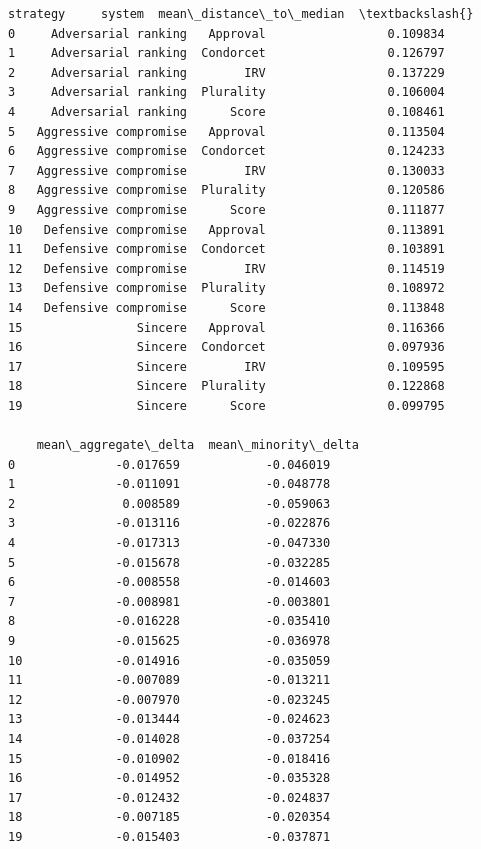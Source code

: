 \documentclass[11pt]{article}
\makeatletter
\newcommand{\boxspacing}{\kern\kvtcb@left@rule\kern\kvtcb@boxsep}
\newcommand{\prompt}[4]{
        {\ttfamily\llap{{\color{#2}[#3]:\hspace{3pt}#4}}\vspace{-\baselineskip}}
    }
\makeatother
\begin{document}
            \begin{tcolorbox}[breakable, size=fbox, boxrule=.5pt, pad at break*=1mm, opacityfill=0]
\prompt{Out}{outcolor}{108}{\boxspacing}
\begin{Verbatim}[commandchars=\\\{\}]
                 strategy     system  mean\_distance\_to\_median  \textbackslash{}
0     Adversarial ranking   Approval                 0.109834
1     Adversarial ranking  Condorcet                 0.126797
2     Adversarial ranking        IRV                 0.137229
3     Adversarial ranking  Plurality                 0.106004
4     Adversarial ranking      Score                 0.108461
5   Aggressive compromise   Approval                 0.113504
6   Aggressive compromise  Condorcet                 0.124233
7   Aggressive compromise        IRV                 0.130033
8   Aggressive compromise  Plurality                 0.120586
9   Aggressive compromise      Score                 0.111877
10   Defensive compromise   Approval                 0.113891
11   Defensive compromise  Condorcet                 0.103891
12   Defensive compromise        IRV                 0.114519
13   Defensive compromise  Plurality                 0.108972
14   Defensive compromise      Score                 0.113848
15                Sincere   Approval                 0.116366
16                Sincere  Condorcet                 0.097936
17                Sincere        IRV                 0.109595
18                Sincere  Plurality                 0.122868
19                Sincere      Score                 0.099795

    mean\_aggregate\_delta  mean\_minority\_delta
0              -0.017659            -0.046019
1              -0.011091            -0.048778
2               0.008589            -0.059063
3              -0.013116            -0.022876
4              -0.017313            -0.047330
5              -0.015678            -0.032285
6              -0.008558            -0.014603
7              -0.008981            -0.003801
8              -0.016228            -0.035410
9              -0.015625            -0.036978
10             -0.014916            -0.035059
11             -0.007089            -0.013211
12             -0.007970            -0.023245
13             -0.013444            -0.024623
14             -0.014028            -0.037254
15             -0.010902            -0.018416
16             -0.014952            -0.035328
17             -0.012432            -0.024837
18             -0.007185            -0.020354
19             -0.015403            -0.037871
\end{Verbatim}
\end{tcolorbox}
        
\end{document}
